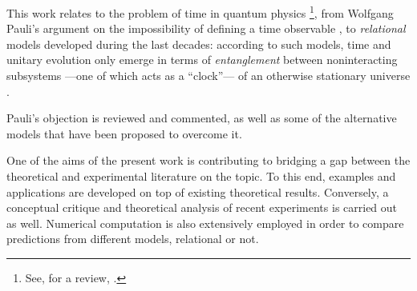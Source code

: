 This work relates to the problem of time in quantum physics%
\footnote{
  See, for a review, \cite{TQM1, TQM2}.
},
from Wolfgang Pauli's argument
on the impossibility of defining a time observable \parencite{PauliFootnote},
to \emph{relational} models developed during the last decades:
according to such models,
time and unitary evolution only emerge in
terms of \emph{entanglement} between noninteracting subsystems
---one of which acts as a ``clock''---
of an otherwise stationary universe \parencite{PageWootters, Marletto:Evolution}.

Pauli's objection is reviewed and commented,
as well as some of the alternative models
that have been proposed
to overcome it.

One of the aims of the present work
is contributing to bridging a gap between the theoretical
and experimental literature on the topic.
To this end, examples and applications are developed on top of existing theoretical results.
Conversely,
a conceptual critique and theoretical analysis
of recent experiments is carried out as well.
Numerical computation is also extensively employed in order to compare
predictions from different models, relational or not.